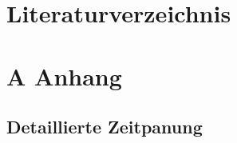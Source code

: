 \documentclass[a4paper,12pt]{article}
\begin{document}
\clearpage
\section*{Literaturverzeichnis}




\clearpage
{}
\appendix
\renewcommand{\thesubsection}{A.\arabic{subsection}}
\section*{A Anhang}
\subsection{Detaillierte Zeitpanung}
\label{sec:detaillierte zeitplanung}
\end{document}
